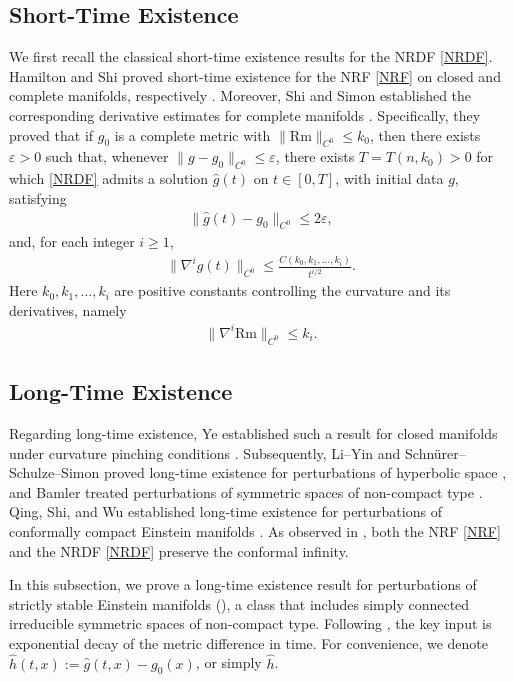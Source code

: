 \documentclass[12pt]{amsart}
\begin{document}
\subsection{Short-Time Existence}
We first recall the classical short-time existence results for the NRDF \eqref{NRDF}. Hamilton and Shi proved short-time existence for the NRF \eqref{NRF} on closed and complete manifolds, respectively \cite{Ha1982, Sh1989}. Moreover, Shi and Simon established the corresponding derivative estimates for complete manifolds \cite{Sh1989, Si2002}. Specifically, they proved that if $g_0$ is a complete metric with $\|\mathrm{Rm}\|_{C^0} \le k_0$, then there exists $\varepsilon>0$ such that, whenever $\|g-g_0\|_{C^0} \le \varepsilon$, there exists $T = T(n,k_0) > 0$ for which \eqref{NRDF} admits a solution $\hat g(t)$ on $t\in[0,T]$, with initial data $g$, satisfying
\begin{align}
    \|\hat g(t) - g_0\|_{C^0} \le 2\varepsilon,
\end{align}
and, for each integer $i\ge 1$,
\begin{align}
    \|\nabla^{i}\hat g(t)\|_{C^0}\le \frac{C(k_0,k_1,\dots,k_i)}{t^{i/2}}.
\end{align}
Here $k_0,k_1,\dots,k_i$ are positive constants controlling the curvature and its derivatives, namely
\begin{align}
    \|\nabla^{i}\mathrm{Rm}\|_{C^0} \le k_i.
\end{align}



\subsection{Long-Time Existence}
Regarding long-time existence, Ye established such a result for closed manifolds under curvature pinching conditions \cite{Ye1993}. Subsequently, Li--Yin and Schn\"urer--Schulze--Simon proved long-time existence for perturbations of hyperbolic space \cite{LY2010,SSS2010}, and Bamler treated perturbations of symmetric spaces of non-compact type \cite{Ba2015}. Qing, Shi, and Wu established long-time existence for perturbations of conformally compact Einstein manifolds \cite{QSW2013}. As observed in \cite{HJS2016, QSW2013}, both the NRF \eqref{NRF} and the NRDF \eqref{NRDF} preserve the conformal infinity.

In this subsection, we prove a long-time existence result for perturbations of strictly stable Einstein manifolds (), a class that includes simply connected irreducible symmetric spaces of non-compact type. Following \cite{LY2010, QSW2013, Ye1993}, the key input is exponential decay of the metric difference in time. For convenience, we denote $\hat{h}(t,x) := \hat{g}(t,x) - g_0(x)$, or simply $\hat{h}$.
\end{document}

